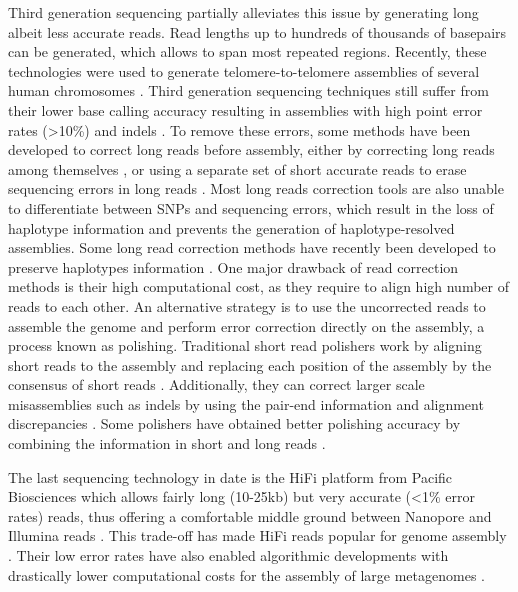 Third generation sequencing partially alleviates this issue by generating long albeit less accurate reads. Read lengths up to hundreds of thousands of basepairs can be generated, which allows to span most repeated regions. Recently, these technologies were used to generate telomere-to-telomere assemblies of several human chromosomes \citep{migaTelomeretotelomereAssemblyComplete2020,logsdonStructureFunctionEvolution2021}. Third generation sequencing techniques still suffer from their lower base calling accuracy resulting in assemblies with high point error rates (>10\%) and indels \cite{weiratherComprehensiveComparisonPacific2017,jainNanoporeSequencingAssembly2018}. To remove these errors, some methods have been developed to correct long reads before assembly, either by correcting long reads among themselves \cite{morisseScalableLongRead2021}, or using a separate set of short accurate reads to erase sequencing errors in long reads \cite{wangFMLRCHybridLong2018}. Most long reads correction tools are also unable to differentiate between SNPs and sequencing errors, which result in the loss of haplotype information and prevents the generation of haplotype-resolved assemblies. Some long read correction methods have recently been developed to preserve haplotypes information \cite{holleyRatatoskHybridError2021}. One major drawback of read correction methods is their high computational cost, as they require to align high number of reads to each other. An alternative strategy is to use the uncorrected reads to assemble the genome and perform error correction directly on the assembly, a process known as \Gls{polishing}. Traditional short read polishers work by aligning short reads to the assembly and replacing each position of the assembly by the consensus of short reads \cite{vaserFastAccurateNovo2017}. Additionally, they can correct larger scale misassemblies such as indels by using the pair-end information and alignment discrepancies \cite{walkerPilonIntegratedTool2014}. Some polishers have obtained better polishing accuracy by combining the information in short and long reads \cite{kunduHyPoSuperFast2019}.


The last sequencing technology in date is the HiFi platform from Pacific Biosciences which allows fairly long (10-25kb) but very accurate (<1\% error rates) reads, thus offering a comfortable middle ground between Nanopore and Illumina reads \cite{wengerAccurateCircularConsensus2019}. This trade-off has made HiFi reads popular for genome assembly \cite{langComparisonTwoUptodate2020,chengHaplotyperesolvedNovoAssembly2021,chengHaplotyperesolvedNovoAssembly2021}. Their low error rates have also enabled algorithmic developments with drastically lower computational costs for the assembly of large metagenomes \cite{ekimMinimizerspaceBruijnGraphs2021}.

